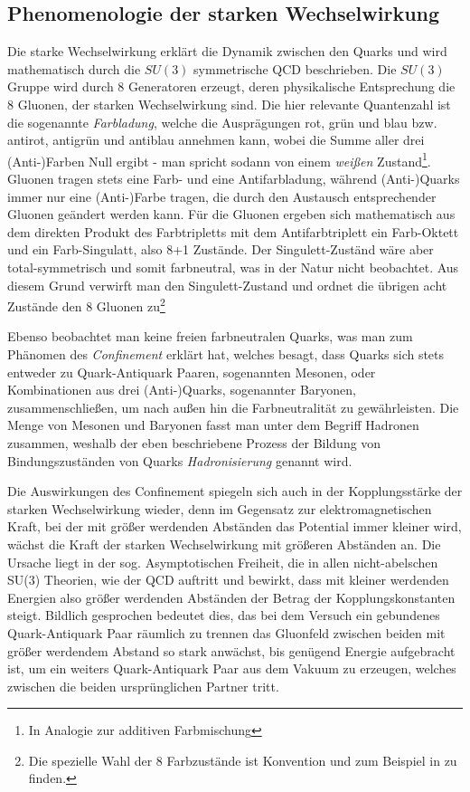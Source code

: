 \subsection{Phenomenologie der starken Wechselwirkung}
\label{theory:qcd}
Die starke Wechselwirkung erklärt die Dynamik zwischen den Quarks und wird
mathematisch durch die $SU(3)$ symmetrische \acl{QCD} beschrieben. Die $SU(3)$
Gruppe wird durch 8 Generatoren erzeugt, deren physikalische Entsprechung die 8
Gluonen, der starken Wechselwirkung sind. Die hier relevante Quantenzahl ist
die sogenannte \textit{Farbladung}, welche die Ausprägungen rot, grün und blau
bzw. antirot, antigrün und antiblau annehmen kann, wobei die Summe aller drei
(Anti-)Farben Null ergibt - man spricht sodann von einem \textit{weißen}
Zustand\footnote{In Analogie zur additiven Farbmischung}. Gluonen tragen stets
eine Farb- und eine Antifarbladung, während (Anti-)Quarks immer nur eine
(Anti-)Farbe tragen, die durch den Austausch entsprechender Gluonen geändert
werden kann. Für die Gluonen ergeben sich mathematisch aus dem direkten Produkt
des Farbtripletts mit dem Antifarbtriplett ein Farb-Oktett und ein
Farb-Singulatt, also 8+1 Zustände. Der Singulett-Zuständ wäre aber
total-symmetrisch und somit farbneutral, was in der Natur nicht beobachtet. Aus
diesem Grund verwirft man den Singulett-Zustand und ordnet die übrigen acht
Zustände den 8 Gluonen zu\footnote{Die spezielle Wahl der 8 Farbzustände ist
Konvention und zum Beispiel in \cite{Fritzsch:1973pi} zu finden.}

Ebenso beobachtet man keine freien farbneutralen Quarks, was man zum Phänomen
des \textit{Confinement} erklärt hat, welches besagt, dass Quarks sich stets
entweder zu Quark-Antiquark Paaren, sogenannten Mesonen, oder Kombinationen aus
drei \mbox{(Anti-)Quarks}, sogenannter Baryonen, zusammenschließen, um nach
außen hin die Farbneutralität zu gewährleisten. Die Menge von Mesonen und
Baryonen fasst man unter dem Begriff Hadronen zusammen, weshalb der eben
beschriebene Prozess der Bildung von Bindungszuständen von Quarks
\textit{Hadronisierung} genannt wird.

Die Auswirkungen des Confinement spiegeln sich auch in der Kopplungsstärke der
starken Wechselwirkung wieder, denn im Gegensatz zur elektromagnetischen Kraft,
bei der mit größer werdenden Abständen das Potential immer kleiner wird, wächst
die Kraft der starken Wechselwirkung mit größeren Abständen an. Die Ursache
liegt in der sog. Asymptotischen Freiheit, die in allen nicht-abelschen SU(3)
Theorien, wie der QCD auftritt und bewirkt, dass mit kleiner werdenden Energien
also größer werdenden Abständen der Betrag der Kopplungskonstanten steigt.
Bildlich gesprochen bedeutet dies, das bei dem Versuch ein gebundenes
Quark-Antiquark Paar räumlich zu trennen das Gluonfeld zwischen beiden mit
größer werdendem Abstand so stark anwächst, bis genügend Energie aufgebracht
ist, um ein weiters Quark-Antiquark Paar aus dem Vakuum zu erzeugen, welches
zwischen die beiden ursprünglichen Partner tritt.



